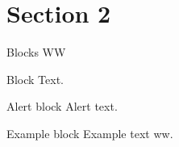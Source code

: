 \documentclass[aspectratio=169]{beamer}
\begin{document}
    \section{Section 2}
    \begin{frame}{Blocks WW}
        \begin{block}{Block}
            Text.
        \end{block}
        \pause
        \begin{alertblock}{Alert block}
            Alert \alert{text}.
        \end{alertblock}
        \pause
        \begin{exampleblock}{Example block}
            Example \textcolor{example}{text ww}.
        \end{exampleblock}
    \end{frame}
    
\end{document}
